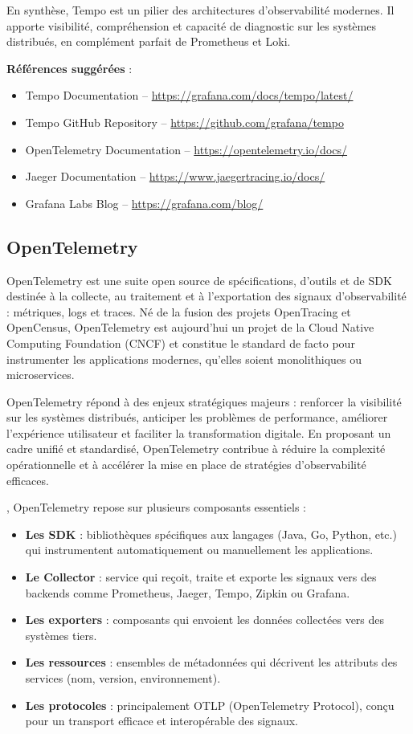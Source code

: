 En synthèse, Tempo est un pilier des architectures d’observabilité modernes. Il apporte visibilité, compréhension et capacité de diagnostic sur les systèmes distribués, en complément parfait de Prometheus et Loki.

\textbf{Références suggérées} :
\begin{itemize}
	\item Tempo Documentation – \url{https://grafana.com/docs/tempo/latest/}
	\item Tempo GitHub Repository – \url{https://github.com/grafana/tempo}
	\item OpenTelemetry Documentation – \url{https://opentelemetry.io/docs/}
	\item Jaeger Documentation – \url{https://www.jaegertracing.io/docs/}
	\item Grafana Labs Blog – \url{https://grafana.com/blog/}
\end{itemize}


\subsection{OpenTelemetry}

OpenTelemetry est une suite open source de spécifications, d’outils et de SDK destinée à la collecte, au traitement et à l’exportation des signaux d’observabilité  : métriques, logs et traces. Né de la fusion des projets OpenTracing et OpenCensus, OpenTelemetry est aujourd’hui un projet de la Cloud Native Computing Foundation (CNCF) et constitue le standard de facto pour instrumenter les applications modernes, qu’elles soient monolithiques ou microservices.

 OpenTelemetry répond à des enjeux stratégiques majeurs  : renforcer la visibilité sur les systèmes distribués, anticiper les problèmes de performance, améliorer l’expérience utilisateur et faciliter la transformation digitale. En proposant un cadre unifié et standardisé, OpenTelemetry contribue à réduire la complexité opérationnelle et à accélérer la mise en place de stratégies d’observabilité efficaces.

, OpenTelemetry repose sur plusieurs composants essentiels  :
\begin{itemize}
	\item \textbf{Les SDK}  : bibliothèques spécifiques aux langages (Java, Go, Python, etc.) qui instrumentent automatiquement ou manuellement les applications.
	\item \textbf{Le Collector}  : service qui reçoit, traite et exporte les signaux vers des backends comme Prometheus, Jaeger, Tempo, Zipkin ou Grafana.
	\item \textbf{Les exporters}  : composants qui envoient les données collectées vers des systèmes tiers.
	\item \textbf{Les ressources}  : ensembles de métadonnées qui décrivent les attributs des services (nom, version, environnement).
	\item \textbf{Les protocoles}  : principalement OTLP (OpenTelemetry Protocol), conçu pour un transport efficace et interopérable des signaux.
\end{itemize}

